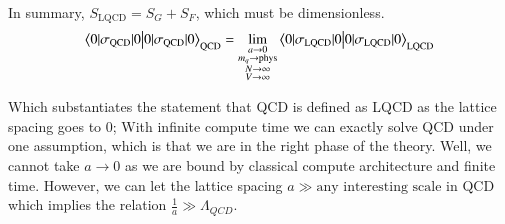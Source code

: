 In summary, $S_{\text{LQCD}} = S_G + S_F$, which must be dimensionless. 
\begin{equation}
    \braket{0|\sigma_{\text{QCD}}|0}_{\text{QCD}} = \lim_{\substack{a\to 0 \\ m_q \to \text{phys} \\ N\to\infty \\ V \to \infty}} \braket{0|\sigma_{\text{LQCD}}|0}_{\text{LQCD}}
\end{equation}

Which substantiates the statement that QCD is defined as LQCD as the lattice spacing goes to 0; With infinite compute time we can exactly solve QCD under one assumption, which is that we are in the right phase of the theory. Well, we cannot take $a\rightarrow 0$ as we are bound by classical compute architecture and finite time. However, we can let the lattice spacing $a \gg \text{any interesting scale in QCD}$ which implies the relation $\frac{1}{a} \gg \Lambda_{QCD}$. 

